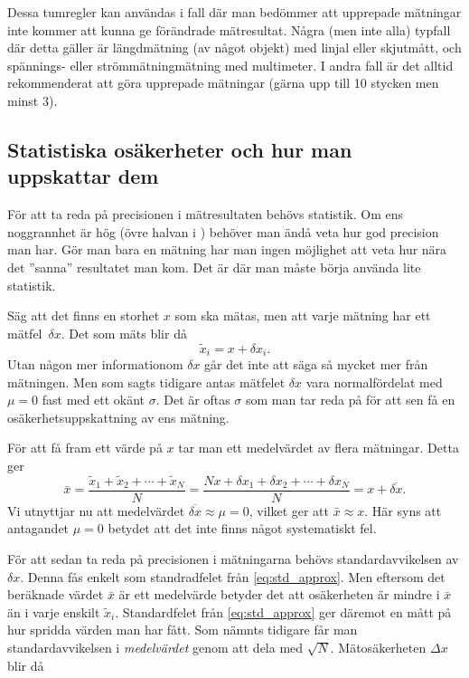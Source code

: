 \documentclass[11pt,a4paper, swedish
]{article}
\begin{document}
Dessa tumregler kan användas i fall där man bedömmer att upprepade
mätningar inte kommer att kunna ge förändrade mätresultat. Några (men
inte alla) typfall där detta gäller är längdmätning (av något objekt)
med linjal eller skjutmått, och spännings- eller strömmätningmätning
med multimeter. I andra fall är det alltid rekommenderat att göra
upprepade mätningar (gärna upp till 10 stycken men minst 3). 


\subsection{Statistiska osäkerheter och hur man uppskattar dem}
För att ta reda på precisionen i mätresultaten behövs statistik. Om
ens noggrannhet är hög (övre halvan i ) behöver
man ändå veta hur god precision man har. Gör man bara en mätning har
man ingen möjlighet att veta hur nära det ''sanna'' resultatet man
kom. Det är där man måste börja använda lite statistik. 

Säg att det finns en storhet $x$ som ska mätas, men att varje mätning
har ett mätfel~$\delta{x}$. Det som mäts blir då
\begin{equation}
\widetilde{x}_i=x+\delta{x}_i.
\end{equation}
Utan någon mer informationom $\delta{x}$ går det inte att säga så mycket mer
från mätningen. Men som sagts tidigare antas mätfelet $\delta{x}$ vara
normalfördelat med $\mu=0$ fast med ett okänt $\sigma$. Det är oftas
$\sigma$ som man tar reda på för att sen få en osäkerhetsuppskattning av
ens mätning. 

För att få fram ett värde på $x$ tar man ett medelvärdet av flera
mätningar. Detta ger
\begin{equation}
\bar{x}=\frac{\widetilde{x}_1+\widetilde{x}_2 + \cdots + \widetilde{x}_N}{N} 
= \frac{Nx+\delta{x}_1+\delta{x}_2 + \cdots + \delta{x}_N}{N}
= x + \overline{\delta{x}}.
\end{equation}
Vi utnyttjar nu att medelvärdet
$\overline{\delta{x}}\approx\mu=0$, vilket ger att $\bar{x}\approx x$.
Här syns att antagandet $\mu=0$ betydet att det inte finns något
systematiskt fel.

För att sedan ta reda på precisionen i mätningarna behövs
standardavvikelsen av $\delta{x}$. Denna fås enkelt som standradfelet
från \eqref{eq:std_approx}. Men eftersom det beräknade värdet
$\bar{x}$ är ett medelvärde betyder det att osäkerheten är mindre i
$\bar{x}$ än i varje enskilt $\widetilde{x}_i$. Standardfelet från
\eqref{eq:std_approx} ger däremot en mått på hur spridda värden man
har fått. Som nämnts tidigare får man standardavvikelsen i
\emph{medelvärdet} genom att dela med
$\sqrt{N}$. Mätosäkerheten\footnotemark{} $\Delta{x}$ blir då
\end{document}
